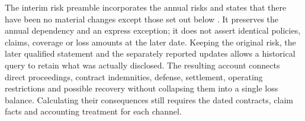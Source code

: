 The interim risk preamble incorporates the annual risks and states that there
have been no material changes except those set out below
\citep[Part II, Item 1A, printed p.~19]{apple2025q1}. It preserves the annual
dependency and an express exception; it does not assert identical policies,
claims, coverage or loss amounts at the later date. Keeping the original risk,
the later qualified statement and the separately reported updates allows a
historical query to retain what was actually disclosed. The resulting account
connects direct proceedings, contract indemnities, defense, settlement,
operating restrictions and possible recovery without collapsing them into a
single loss balance. Calculating their consequences still requires the dated
contracts, claim facts and accounting treatment for each channel.
